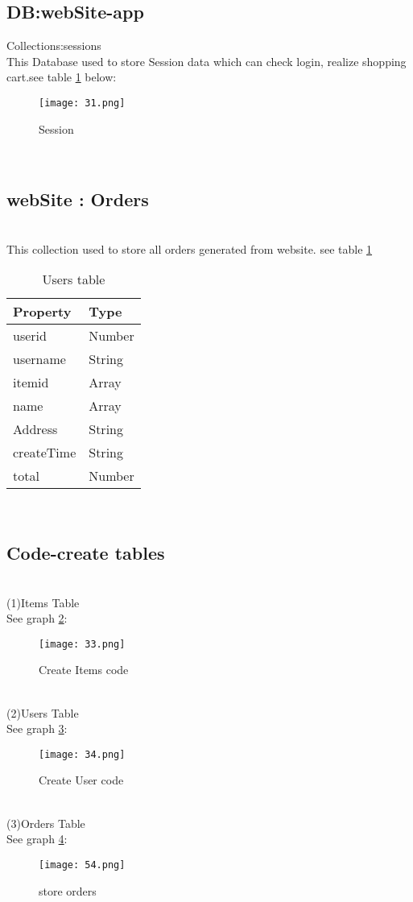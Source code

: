\subsection{DB:webSite-app}
Collections:sessions\\
This Database used to store Session data which can check login, realize shopping cart.see table \ref{fig:10 cubed graph} below:
\\
\begin{figure}[h]
	\centering
	\texttt{[image: 31.png]}
	\caption{Session}
	\label{fig:10 cubed graph}
\end{figure}
\\
\subsection{webSite : Orders}
\\
This collection used to store all orders generated from website.
see table \ref{tab:4}
\\
\begin{table}[h]
	\centering
	\begin{tabular}{l | l}
		Property & Type \\
		\hline
		userid & Number \\
		username & String\\
		itemid & Array\\
		name & Array\\
		Address & String\\
		createTime & String\\
		total & Number
	\end{tabular}
	\caption{Users table}
	\label{tab:4}
\end{table}
\\
\subsection{Code-create tables}
\\
(1)Items Table\\
See graph \ref{fig:12 cubed graph}:\\
\begin{figure}[h]
	\centering
	\texttt{[image: 33.png]}
	\caption{Create Items code}
	\label{fig:12 cubed graph}
\end{figure}
\\
(2)Users Table\\
See graph \ref{fig:13 cubed graph}:\\
\begin{figure}[h]
	\centering
	\texttt{[image: 34.png]}
	\caption{Create User code}
	\label{fig:13 cubed graph}
\end{figure}
\\
(3)Orders Table\\
See graph \ref{fig:ord cubed graph}:\\
\begin{figure}[h]
	\centering
	\texttt{[image: 54.png]}
	\caption{store orders}
	\label{fig:ord cubed graph}
\end{figure}
\\
